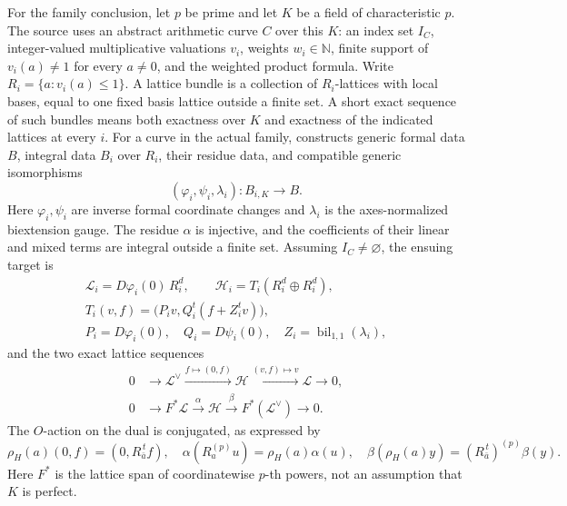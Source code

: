 For the family conclusion, let \(p\) be prime and let
\(K\) be a field of characteristic \(p\).
The source uses an abstract arithmetic curve \(C\) over
this \(K\): an index set \(I_C\),
integer-valued multiplicative valuations \(v_i\), weights
\(w_i\in\mathbb N\), finite support of \(v_i(a)\ne1\) for
every \(a\ne0\), and the weighted product formula.
Write \(R_i=\{a:v_i(a)\le1\}\).
A lattice bundle is a collection of \(R_i\)-lattices with
local bases, equal to one fixed basis lattice outside a
finite set.  A short exact sequence of such bundles means
both exactness over \(K\) and exactness of the indicated
lattices at every \(i\).
For a curve in the actual family, 
constructs generic formal data \(B\), integral data \(B_i\)
over \(R_i\), their residue data, and compatible generic
isomorphisms
\[
                   (\varphi_i,\psi_i,\lambda_i):
                                  B_{i,K}\longrightarrow B.
\]
Here \(\varphi_i,\psi_i\) are inverse formal coordinate
changes and \(\lambda_i\) is the axes-normalized
biextension gauge.  The residue \(\alpha\) is injective,
and the coefficients of their linear and mixed terms
are integral outside a finite set.
Assuming \(I_C\ne\varnothing\), the ensuing target is
\[
 \begin{gathered}
 \mathcal L_i=D\varphi_i(0)\,R_i^d,\qquad
 \mathcal H_i=T_i(R_i^d\oplus R_i^d),\\
 T_i(v,f)=\bigl(P_iv,Q_i^t(f+Z_i^tv)\bigr),\\
 P_i=D\varphi_i(0),\quad Q_i=D\psi_i(0),\quad
 Z_i=\operatorname{bil}_{1,1}(\lambda_i),
 \end{gathered}
 \tag{FC5}\label{eq:faithful-family-lattices}
\]
and the two exact lattice sequences
\[
 \begin{split}
 0&\longrightarrow\mathcal L^\vee
       \stackrel{f\mapsto(0,f)}\longrightarrow\mathcal H
       \stackrel{(v,f)\mapsto v}\longrightarrow\mathcal L
       \longrightarrow0,\\
 0&\longrightarrow F^*\mathcal L
       \stackrel\alpha\longrightarrow\mathcal H
       \stackrel\beta\longrightarrow F^*(\mathcal L^\vee)
       \longrightarrow0.
 \end{split}
 \tag{FC6}\label{eq:faithful-two-sequences-target}
\]
The \(O\)-action on the dual is conjugated, as expressed by
\[
 \rho_H(a)(0,f)=(0,R_{\bar a}^{\,t}f),\quad
 \alpha(R_a^{(p)}u)=\rho_H(a)\alpha(u),\quad
 \beta(\rho_H(a)y)=(R_{\bar a}^{\,t})^{(p)}\beta(y).
 \tag{FC7}\label{eq:faithful-frobenius-equivariance}
\]
Here \(F^*\) is the lattice span of coordinatewise \(p\)-th
powers, not an assumption that \(K\) is perfect.

